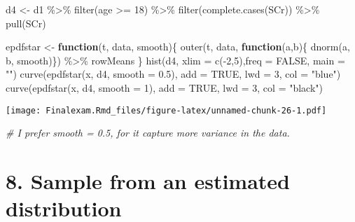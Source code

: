 \documentclass[
]{article}
\newenvironment{Shaded}{\begin{snugshade}}{\end{snugshade}}
\newcommand{\AttributeTok}[1]{\textcolor[rgb]{0.77,0.63,0.00}{#1}}
\newcommand{\CommentTok}[1]{\textcolor[rgb]{0.56,0.35,0.01}{\textit{#1}}}
\newcommand{\ConstantTok}[1]{\textcolor[rgb]{0.00,0.00,0.00}{#1}}
\newcommand{\ControlFlowTok}[1]{\textcolor[rgb]{0.13,0.29,0.53}{\textbf{#1}}}
\newcommand{\DecValTok}[1]{\textcolor[rgb]{0.00,0.00,0.81}{#1}}
\newcommand{\FloatTok}[1]{\textcolor[rgb]{0.00,0.00,0.81}{#1}}
\newcommand{\FunctionTok}[1]{\textcolor[rgb]{0.00,0.00,0.00}{#1}}
\newcommand{\NormalTok}[1]{#1}
\newcommand{\OtherTok}[1]{\textcolor[rgb]{0.56,0.35,0.01}{#1}}
\newcommand{\SpecialCharTok}[1]{\textcolor[rgb]{0.00,0.00,0.00}{#1}}
\newcommand{\StringTok}[1]{\textcolor[rgb]{0.31,0.60,0.02}{#1}}
\begin{document}
\begin{Shaded}
\begin{Highlighting}[]
\NormalTok{d4 }\OtherTok{\textless{}{-}}\NormalTok{ d1 }\SpecialCharTok{\%\textgreater{}\%} 
  \FunctionTok{filter}\NormalTok{(age }\SpecialCharTok{\textgreater{}=} \DecValTok{18}\NormalTok{) }\SpecialCharTok{\%\textgreater{}\%} 
  \FunctionTok{filter}\NormalTok{(}\FunctionTok{complete.cases}\NormalTok{(SCr)) }\SpecialCharTok{\%\textgreater{}\%} 
  \FunctionTok{pull}\NormalTok{(SCr)}

\NormalTok{epdfstar }\OtherTok{\textless{}{-}} \ControlFlowTok{function}\NormalTok{(t, data, smooth)\{}
  \FunctionTok{outer}\NormalTok{(t, data, }\ControlFlowTok{function}\NormalTok{(a,b)\{ }\FunctionTok{dnorm}\NormalTok{(a, b, smooth)\}) }\SpecialCharTok{\%\textgreater{}\%}\NormalTok{ rowMeans}
\NormalTok{\}}
\FunctionTok{hist}\NormalTok{(d4, }\AttributeTok{xlim =} \FunctionTok{c}\NormalTok{(}\SpecialCharTok{{-}}\DecValTok{2}\NormalTok{,}\DecValTok{5}\NormalTok{),}\AttributeTok{freq =} \ConstantTok{FALSE}\NormalTok{, }\AttributeTok{main =} \StringTok{""}\NormalTok{)}
\FunctionTok{curve}\NormalTok{(}\FunctionTok{epdfstar}\NormalTok{(x, d4, }\AttributeTok{smooth =} \FloatTok{0.5}\NormalTok{), }\AttributeTok{add =} \ConstantTok{TRUE}\NormalTok{, }\AttributeTok{lwd =} \DecValTok{3}\NormalTok{, }\AttributeTok{col =} \StringTok{"blue"}\NormalTok{)}
\FunctionTok{curve}\NormalTok{(}\FunctionTok{epdfstar}\NormalTok{(x, d4, }\AttributeTok{smooth =} \DecValTok{1}\NormalTok{), }\AttributeTok{add =} \ConstantTok{TRUE}\NormalTok{, }\AttributeTok{lwd =} \DecValTok{3}\NormalTok{, }\AttributeTok{col =} \StringTok{"black"}\NormalTok{)}
\end{Highlighting}
\end{Shaded}

\texttt{[image: Finalexam.Rmd\_files/figure-latex/unnamed-chunk-26-1.pdf]}

\begin{Shaded}
\begin{Highlighting}[]
\CommentTok{\# I prefer smooth = 0.5, for it capture more variance in the data.}
\end{Highlighting}
\end{Shaded}

\hypertarget{sample-from-an-estimated-distribution}{%
\section{8. Sample from an estimated
distribution}\label{sample-from-an-estimated-distribution}}
\end{document}
